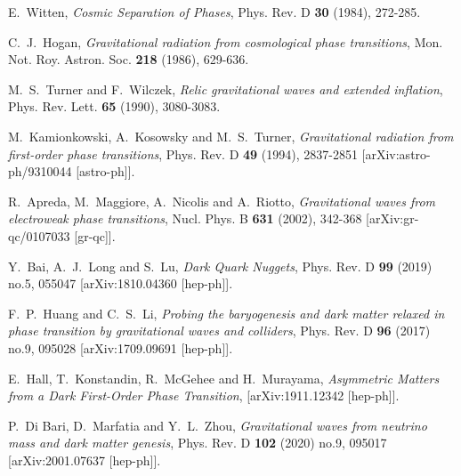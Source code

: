 \documentclass[a4paper,11pt]{article}
\begin{document}
\begin{thebibliography}{99}

E.~Witten, {\em Cosmic Separation of Phases},
Phys. Rev. D \textbf{30} (1984), 272-285.

C.~J.~Hogan,
{\em Gravitational radiation from cosmological phase transitions},
Mon. Not. Roy. Astron. Soc. \textbf{218} (1986), 629-636.

M.~S.~Turner and F.~Wilczek,
{\em Relic gravitational waves and extended inflation},
Phys. Rev. Lett. \textbf{65} (1990), 3080-3083.

M.~Kamionkowski, A.~Kosowsky and M.~S.~Turner,
{\em Gravitational radiation from first-order phase transitions},
Phys. Rev. D \textbf{49} (1994), 2837-2851
[arXiv:astro-ph/9310044 [astro-ph]].

R.~Apreda, M.~Maggiore, A.~Nicolis and A.~Riotto,
{\em Gravitational waves from electroweak phase transitions},
Nucl. Phys. B \textbf{631} (2002), 342-368
[arXiv:gr-qc/0107033 [gr-qc]].

Y.~Bai, A.~J.~Long and S.~Lu, {\em Dark Quark Nuggets},
Phys. Rev. D \textbf{99} (2019) no.5, 055047
[arXiv:1810.04360 [hep-ph]].

F.~P.~Huang and C.~S.~Li,
{\em Probing the baryogenesis and dark matter relaxed in phase transition by gravitational waves and colliders},
Phys. Rev. D \textbf{96} (2017) no.9, 095028
[arXiv:1709.09691 [hep-ph]].

E.~Hall, T.~Konstandin, R.~McGehee and H.~Murayama,
{\em Asymmetric Matters from a Dark First-Order Phase Transition},
[arXiv:1911.12342 [hep-ph]].

P.~Di Bari, D.~Marfatia and Y.~L.~Zhou,
{\em Gravitational waves from neutrino mass and dark matter genesis},
Phys. Rev. D \textbf{102} (2020) no.9, 095017
[arXiv:2001.07637 [hep-ph]].


\end{thebibliography}
\end{document}
